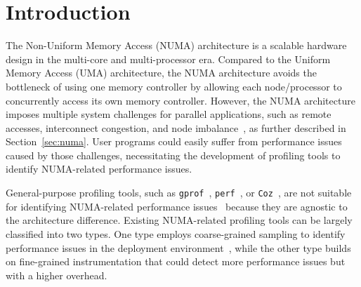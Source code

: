 \section{Introduction}
\label{sec:intro}

The Non-Uniform Memory Access (NUMA) architecture is a scalable hardware design in the multi-core and multi-processor era. Compared to the Uniform Memory Access (UMA) architecture, the NUMA architecture avoids the bottleneck of using one memory controller by allowing each node/processor to concurrently access its own memory controller. However, the NUMA architecture imposes multiple system challenges for parallel applications, such as remote accesses, interconnect congestion, and node imbalance~\cite{Blagodurov:2011:CNC:2002181.2002182}, as further described in Section~\ref{sec:numa}. User programs could easily suffer from performance issues caused by those challenges, necessitating the development of profiling tools to identify NUMA-related performance issues. 

General-purpose profiling tools, such as \texttt{gprof}~\cite{DBLP:conf/sigplan/GrahamKM82}, \texttt{perf}~\cite{perf}, or \texttt{Coz}~\cite{Coz}, are not suitable for identifying NUMA-related performance issues~\cite{XuNuma,NumaPerf} because they are agnostic to the architecture difference. 
Existing NUMA-related profiling tools can be largely classified into two types. One type employs coarse-grained sampling to identify performance issues in the deployment environment~\cite{XuNuma}, while the other type builds on fine-grained instrumentation that could detect more performance issues but with a higher overhead. 


